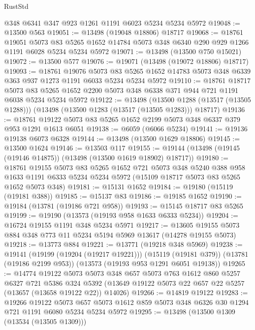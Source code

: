 \begin{lexlean}{RustStd}
\begin{coremodule}
    @348
    @6341
    @347
    @923
    @1261
    @1191
    @6023
    @5234
    @5234
    @5972
@19048 := @13500 @563
@19051 := @13498 (@19048 @18806) @18717
@19068 := @18761
    @19051
    @5073
    @83
    @5265
    @1652
    @14784
    @5073
    @348
    @6340
    @290
    @929
    @1266
    @1191
    @6028
    @5234
    @5234
    @5972
@19071 := @13498 (@13500 @750 @15021)
@19072 := @13500 @577
@19076 := @19071 (@13498 (@19072 @18806) @18717)
@19093 := @18761
    @19076
    @5073
    @83
    @5265
    @1652
    @14783
    @5073
    @348
    @6339
    @363
    @937
    @1273
    @1191
    @6033
    @5234
    @5234
    @5972
@19110 := @18761
    @18717
    @5073
    @83
    @5265
    @1652
    @2200
    @5073
    @348
    @6338
    @371
    @944
    @721
    @1191
    @6038
    @5234
    @5234
    @5972
@19122 := @13498
    (@13500 @1288 (@13517 (@13505 @1288)))
    (@13498 (@13500 @1283 (@13517 (@13505 @1283))) @18717)
@19136 := @18761 @19122 @5073 @83 @5265 @1652 @2199 @5073 @348 @6337 @379 @953 @1291 @1613 @6051
@19138 := @6059 (@6066 @5234)
@19141 := @19136 @19138 @6073 @6328
@19144 := @13498 (@13500 @1629 @18806)
@19145 := @13500 @1624
@19146 := @13503 @117
@19155 := @19144 (@13498 (@19145 (@19146 @14875)) (@13498 (@13500 @1619 @18902) @18717))
@19180 := @18761
    @19155
    @5073
    @83
    @5265
    @1652
    @721
    @5073
    @348
    @5240
    @388
    @958
    @1633
    @1191
    @6333
    @5234
    @5234
    @5972
    (@15109 @18717 @5073 @83 @5265 @1652 @5073 @348)
@19181 := @15131 @1652
@19184 := @19180 (@15119 (@19181 @388))
@19185 := @15137 @83
@19186 := @19185 @1652
@19190 := @19184 (@13781 (@19186 @721 @958))
@19193 := @15145 @18717 @83 @5265
@19199 := @19190 (@13573 (@19193 @958 @1633 @6333 @5234))
@19204 := @16724 @19155 @1191 @348 @5234 @5971
@19217 := @13605 @19155 @5073 @884 @348 @773 @11 @5234 @5194 @5969 @13617 (@14278 @19155 @5073)
@19218 := @13773 @884
@19221 := @13771 (@19218 @348 @5969)
@19238 := @19141
    (@19199 (@19204 (@19217 @19221)))
    (@15119 (@19181 @379))
    (@13781 (@19186 @2199 @953))
    (@13573 (@19193 @953 @1291 @6051 @19138))
@19265 := @14774
    @19122
    @5073
    @5073
    @348
    @657
    @5073
    @763
    @1612
    @860
    @5257
    @6327
    @721
    @5386
    @324
    @5392
    (@13649 @19122 @5073 @22 @657 @22 @5257 (@13657 (@13658 @19122 @22)) @14026)
@19266 := @14819 @19122
@19283 := @19266
    @19122
    @5073
    @657
    @5073
    @1612
    @859
    @5073
    @348
    @6326
    @30
    @1294
    @721
    @1191
    @6080
    @5234
    @5234
    @5972
@19295 := @13498
    (@13500 @1309 (@13534 (@13505 @1309)))

\end{coremodule}
\end{lexlean}
